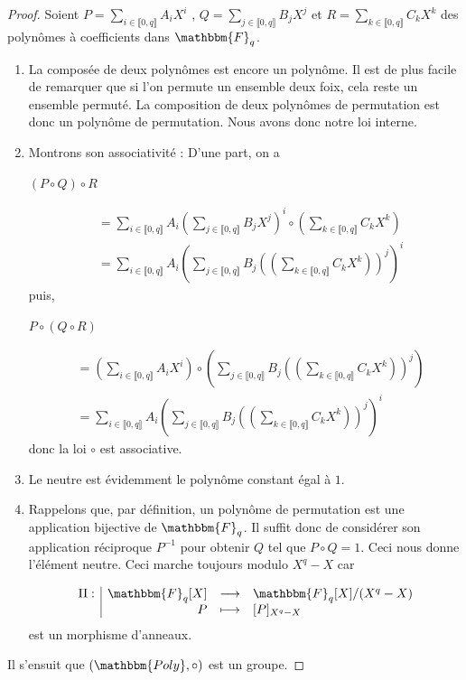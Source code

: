 \documentclass[12pt]{article}
\newcommand{\Fq}{\mathbbm{F}_q}
\newcommand{\fonction}[5]{
\begin{displaymath}
\begin{array}{l|rcl}
\displaystyle
#1 : & #2 & \longrightarrow & #3 \\
    & #4 & \longmapsto & #5
\end{array}
\end{displaymath}
}
\theoremstyle{definition}
\begin{document}
\begin{proof}
Soient $ P = \displaystyle\sum_{i \in \llbracket 0, q \rrbracket} A_i X^i$ , $Q = \displaystyle\sum_{j \in \llbracket 0, q \rrbracket} B_j X^j$ et $R = \displaystyle\sum_{k \in \llbracket 0, q \rrbracket} C_k X^k$ des polynômes à coefficients dans $\Fq$. \newline
\break
	\begin{enumerate}[label=$\clubsuit$, font=\small  \color{black}]
		\item La composée de deux polynômes est encore un polynôme. Il est de plus facile de remarquer que si l'on permute un ensemble deux foix, cela reste un ensemble permuté. La composition de deux polynômes de permutation est donc un polynôme de permutation. Nous avons donc notre loi interne.
		\item Montrons son associativité : \newline
D'une part, on a
			\begin{center} $\left( P\circ Q \right) \circ R$ \end{center}
			\begin{align*} 
&= \displaystyle\sum_{i \in \llbracket 0, q \rrbracket} A_i\left(\displaystyle\sum_{j \in \llbracket 0, q \rrbracket} B_j X^j\right)^i \circ \left(\displaystyle\sum_{k \in \llbracket 0, q \rrbracket} C_k X^k\right) \\ 
&= \displaystyle\sum_{i \in \llbracket 0, q \rrbracket} A_i\left(\displaystyle\sum_{j \in \llbracket 0, q \rrbracket} B_j \left(\left(\displaystyle\sum_{k \in \llbracket 0, q \rrbracket} C_k X^k\right)\right)^j\right)^i
			\end{align*} 
puis, 
			\begin{center} $P\circ \left(Q \circ R\right)$ \end{center}
			\begin{align*} 
&= \left(\displaystyle\sum_{i \in \llbracket 0, q \rrbracket} A_i X^i\right) \circ \left(\displaystyle\sum_{j \in \llbracket 0, q \rrbracket} B_j \left(\left(\displaystyle\sum_{k \in \llbracket 0, q \rrbracket} C_k X^k\right)\right)^j\right) \\
&=  \displaystyle\sum_{i \in \llbracket 0, q \rrbracket} A_i\left(\displaystyle\sum_{j \in \llbracket 0, q \rrbracket} B_j \left(\left(\displaystyle\sum_{k \in \llbracket 0, q \rrbracket} C_k X^k\right)\right)^j\right)^i
			\end{align*} 
donc la loi $\circ$ est associative.
	\item Le neutre est évidemment le polynôme constant égal à $1$.
	\item Rappelons que, par définition, un polynôme de permutation est une application bijective de $\Fq$. Il suffit donc de considérer son application réciproque $P^{-1}$ pour obtenir $Q$ tel que $P\circ Q = 1$. Ceci nous donne l'élément neutre. Ceci marche toujours modulo $X^q - X$ car
	\fonction{\Pi}{\Fq[X]}{\Fq[X] / (X^q - X)}{P}{[P]_{X^q - X}} est un morphisme d'anneaux.
	\end{enumerate}	
Il s'ensuit que $(\mathbbm{Poly}, \circ)$ est un groupe. 
\end{proof}
\end{document}

